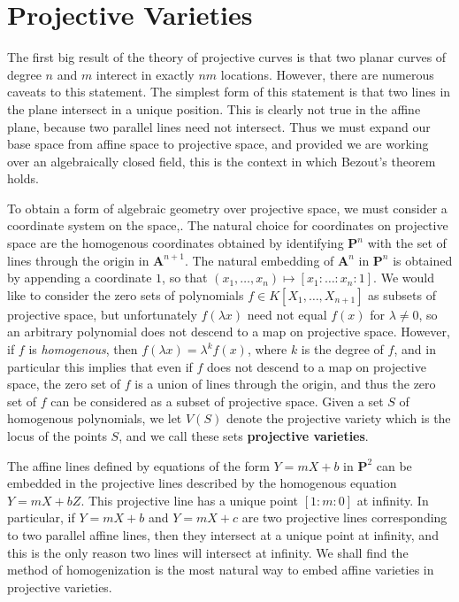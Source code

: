 \chapter{Projective Varieties}

The first big result of the theory of projective curves is that two planar curves of degree $n$ and $m$ interect in exactly $nm$ locations. However, there are numerous caveats to this statement. The simplest form of this statement is that two lines in the plane intersect in a unique position. This is clearly not true in the affine plane, because two parallel lines need not intersect. Thus we must expand our base space from affine space to projective space, and provided we are working over an algebraically closed field, this is the context in which Bezout's theorem holds.

To obtain a form of algebraic geometry over projective space, we must consider a coordinate system on the space,. The natural choice for coordinates on projective space are the homogenous coordinates obtained by identifying $\mathbf{P}^n$ with the set of lines through the origin in $\mathbf{A}^{n+1}$. The natural embedding of $\mathbf{A}^n$ in $\mathbf{P}^n$ is obtained by appending a coordinate $1$, so that $(x_1, \dots, x_n) \mapsto [x_1: \dots: x_n : 1]$. We would like to consider the zero sets of polynomials $f \in K[X_1, \dots, X_{n+1}]$ as subsets of projective space, but unfortunately $f(\lambda x)$ need not equal $f(x)$ for $\lambda \neq 0$, so an arbitrary polynomial does not descend to a map on projective space. However, if $f$ is {\it homogenous}, then $f(\lambda x) = \lambda^k f(x)$, where $k$ is the degree of $f$, and in particular this implies that even if $f$ does not descend to a map on projective space, the zero set of $f$ is a union of lines through the origin, and thus the zero set of $f$ can be considered as a subset of projective space. Given a set $S$ of homogenous polynomials, we let $V(S)$ denote the projective variety which is the locus of the points $S$, and we call these sets {\bf projective varieties}.

\begin{example}
    The affine lines defined by equations of the form $Y = mX + b$ in $\mathbf{P}^2$ can be embedded in the projective lines described by the homogenous equation $Y = mX + bZ$. This projective line has a unique point $[1:m:0]$ at infinity. In particular, if $Y = mX + b$ and $Y = mX + c$ are two projective lines corresponding to two parallel affine lines, then they intersect at a unique point at infinity, and this is the only reason two lines will intersect at infinity. We shall find the method of homogenization is the most natural way to embed affine varieties in projective varieties.
\end{example}

